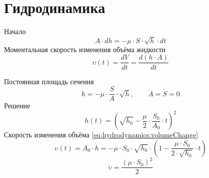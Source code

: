 \section{Гидродинамика}

Начало
\begin{equation*}
  A \cdot dh = - \mu \cdot S \cdot \sqrt{h} \cdot dt
\end{equation*}
Моментальная скорость изменения объёма жидкости
\begin{equation}\label{eq:hydrodynamics:volumeChange}
  \upsilon\left( t \right)
  = \frac{dV}{dt} = \frac{d\left( h \cdot A \right)}{dt}
\end{equation}

Постоянная площадь сечения
\begin{equation*}
  \dot{h}
  = - \mu \cdot \frac{S}{A} \cdot \sqrt{h},
  \qquad  \dot{A} = \dot{S} = 0
\end{equation*}
Решение
\begin{equation*}
  h\left( t \right)
  = \left( \sqrt{h_0}
    - \frac{\mu}{2} \cdot \frac{S_0}{A_0} \cdot t \right)^2
\end{equation*}
Скорость изменения объёма \eqref{eq:hydrodynamics:volumeChange}
\begin{equation*}
  \upsilon\left( t \right)
  = A_0 \cdot \dot{h}
  = - \mu \cdot S_0 \cdot \sqrt{h_0}
    \cdot \left( 1 - \frac{\mu \cdot S_0}{2 \cdot \sqrt{h_0}} \cdot t \right)
\end{equation*}
\begin{equation*}
  \dot{\upsilon}
  = \frac{\left( \mu \cdot S_0 \right)^2}{2}
\end{equation*}

